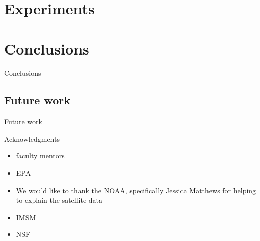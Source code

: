 \documentclass[notheorems,envcountsect,allowframebreaks,xcolor=svgnames,8pt]{beamer}
\begin{document}
\section*{Experiments}
\begin{frame}{}
	
\end{frame}
\section*{Conclusions}
\begin{frame}{Conclusions}
	
\end{frame}
\subsection*{Future work}
\begin{frame}{Future work}
	
\end{frame}
\begin{frame}{Acknowledgments}
\begin{itemize}
\item faculty mentors
\item EPA
\item We would like to thank the NOAA, specifically Jessica Matthews for helping to explain the satellite data
\item IMSM
\item NSF
\end{itemize}
\end{frame}
\end{document}
